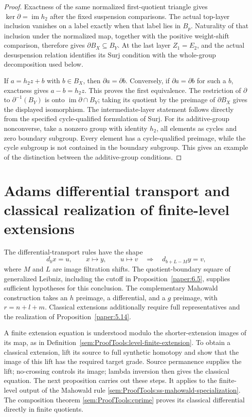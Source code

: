 \begin{proof}
Exactness of the same normalized first-quotient triangle gives
$\ker\partial=\operatorname{im}h_2$ after the fixed suspension comparisons.
The actual top-layer inclusion vanishes on a label exactly when that
label lies in $B_p$. Naturality of that inclusion under the normalized
map, together with the positive weight-shift comparison, therefore gives
$\partial B_X\subseteq B_Y$. At the last layer $Z_1=E_2$, and the
actual desuspension relation identifies its Surj condition with the
whole-group decomposition used below.

If $a=h_2z+b$ with $b\in B_X$, then $\partial a=\partial b$.
Conversely, if $\partial a=\partial b$ for such a $b$, exactness gives
$a-b=h_2z$. This proves the first equivalence. The restriction of
$\partial$ to $\partial^{-1}(B_Y)$ is onto
$\operatorname{im}\partial\cap B_Y$; taking its quotient by the
preimage of $\partial B_X$ gives the displayed isomorphism.
The intermediate-layer statement follows directly from the specified
cycle-qualified formulation of Surj. For its additive-group nonconverse,
take a nonzero group with identity $h_2$, all elements as cycles and zero
boundary subgroup. Every element has a cycle-qualified preimage, while
the cycle subgroup is not contained in the boundary subgroup. This gives an example of the distinction between the additive-group conditions.
\end{proof}


\section{Adams differential transport and classical realization of finite-level extensions}

The differential-transport rules have the shape
\[
d_bx=u,\qquad x\longmapsto y,\qquad u\longmapsto v
\quad\Longrightarrow\quad d_{b+L-M}y=v,
\]
where $M$ and $L$ are image filtration shifts. The quotient-boundary
square of generalized Leibniz, including the cutoff in
Proposition~\ref{paper:6.5}, supplies sufficient hypotheses for this
conclusion. The complementary Mahowald construction takes an $h$
preimage, a differential, and a $g$ preimage, with $r=n+l+m$.
Classical extensions additionally require full representatives and
the realization of Proposition~\ref{paper:5.14}.

A finite extension equation is understood modulo the shorter-extension
images of its map, as in
Definition~\ref{sem:ProofTools:level-finite-extension}.
To obtain a classical extension, lift its source to full synthetic
homotopy and show that the image of this lift has the required target
grade. Source permanence supplies the lift; no-crossing controls its
image; lambda inversion then gives the classical equation.
The next proposition carries out these steps. It applies to the finite-level output of the Mahowald rule
\ref{sem:ProofTools:ss-mahowald-specialization}. The composition theorem
\ref{sem:ProofTools:cprime} proves its classical differential directly
in finite quotients.

